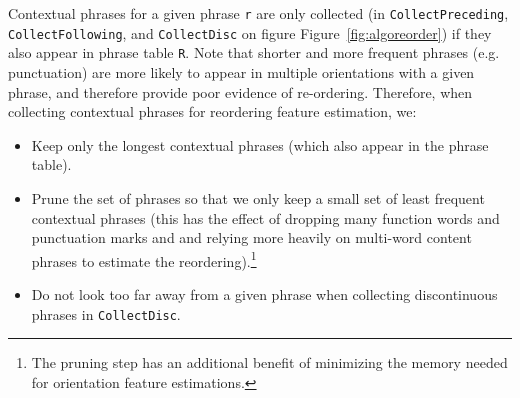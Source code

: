\documentclass[11pt,letterpaper]{article}
\newcommand{\figref}[1]{Figure~\ref{#1}}
\newcommand{\code}[1]{{\small \tt #1}}
\newcommand{\emq}[1]{\emph{``#1''}}
\begin{document}

Contextual phrases for a given phrase \code{r} are only collected (in \code{CollectPreceding}, \code{CollectFollowing}, and \code{CollectDisc} on figure \figref{fig:algoreorder}) if they also appear in phrase table \code{R}.  Note that shorter and more frequent phrases (e.g. punctuation) are more likely to appear in multiple orientations with a given phrase, and therefore provide poor evidence of re-ordering.  Therefore, when collecting contextual phrases for reordering feature estimation, we:

\begin{itemize}
  \item Keep only the longest contextual phrases (which also appear in the phrase table).
  \item Prune the set of phrases so that we only keep a small set of least frequent contextual phrases (this has the effect of dropping many function words and punctuation marks and and relying more heavily on multi-word content phrases to estimate the reordering).\footnote{The pruning step has an additional benefit of minimizing the memory needed for orientation feature estimations.}
  \item Do not look too far away from a given phrase when collecting discontinuous phrases in \code{CollectDisc}.
\end{itemize}
\end{document}
